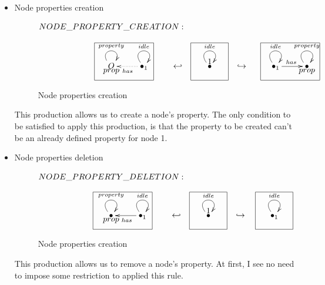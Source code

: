 \documentclass[envcountsect,runningheads]{llncs}
\begin{document}
\begin{itemize}
   
  \item Node properties creation
  \begin{figure}[H]
    \[
       \xymatrix@C=25pt@R=16pt
       {
         {}\POS[]-<0pc,0pc>\drop{NODE\_PROPERTY\_CREATION:}
         \\
         \\
         O \ar@(ul,ur)^{property} \POS[]-<0pc,.5pc>\drop{prop} &
         {\bullet}_{1} \ar@(ul,ur)^{idle} \ar@{.>}^{has}[l]
         \POS[]+<-2pc,.5pc> *+=<6pc,3.8pc>[F-]{} & {\hookleftarrow} &
         {\bullet} \ar@(ul,ur)^{idle}
         \POS[]+<0pc,.5pc> *+=<3.8pc,3.8pc>[F-]{1} & {\hookrightarrow} &
         {\bullet}_{1} \ar@(ul,ur)^{idle} \ar@{->}^{has}[r]
         \POS[]+<1.5pc,.5pc> *+=<6pc,3.8pc>[F-]{} &
         {\bullet} \ar@(ul,ur)^{property} \POS[]-<0pc,.5pc>\drop{prop}
       }
    \]
    \caption{Node properties creation}
    \protect\label{fig:nodecreation}
  \end{figure}
  This production allows us to create a node's property. The only condition to 
  be satisfied to apply this production, is that the property to be created can't be an already
  defined property for node 1.
  
  \item Node properties deletion
  \begin{figure}[H]
    \[
       \xymatrix@C=25pt@R=16pt
       {
         {}\POS[]-<0pc,0pc>\drop{NODE\_PROPERTY\_DELETION:}
         \\
         \\
         {\bullet} \ar@(ul,ur)^{property} \POS[]-<0pc,.5pc>\drop{prop} &
         {\bullet}_{1} \ar@(ul,ur)^{idle} \ar@{->}^{has}[l]
         \POS[]+<-2pc,.5pc> *+=<6pc,3.8pc>[F-]{} & {\hookleftarrow} &
         {\bullet} \ar@(ul,ur)^{idle}
         \POS[]+<0pc,.5pc> *+=<3.8pc,3.8pc>[F-]{1} & {\hookrightarrow} &
         {\bullet}_{1} \ar@(ul,ur)^{idle}
         \POS[]+<0pc,.5pc> *+=<3.8pc,3.8pc>[F-]{}
       }
    \]
    \caption{Node properties creation}
    \protect\label{fig:nodecreation}
  \end{figure}
  This production allows us to remove a node's property. At first, I see no need 
  to impose some restriction to applied this rule.\\
  

\end{itemize}
\end{document}
